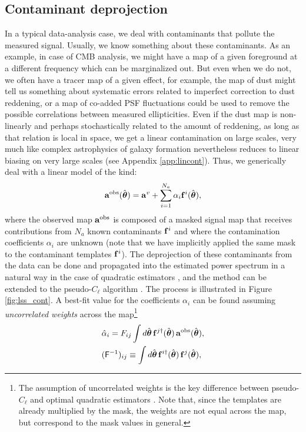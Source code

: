 \documentclass[usenatbib]{mnrasb}
\newcommand{\nv}{\hat{\boldsymbol{\theta}}}
\begin{document}
    \subsection{Contaminant deprojection}\label{ssec:maths.deproj}
      In a typical data-analysis case, we deal with contaminants that pollute the measured signal. Usually, we know something about these contaminants. As an example, in case of CMB analysis, we might have a map of a given foreground at a different frequency which can be marginalized out. But even when we do not, we often have a tracer map of a given effect, for example, the map of dust might tell us something about systematic errors related to imperfect correction to dust reddening, or a map of co-added PSF fluctuations could be used to remove the possible correlations between measured ellipticities. Even if the dust map is non-linearly and perhaps stochastically related to the amount of reddening, as long as that relation is local in space, we get a linear contamination on large scales, very much like complex astrophysics of galaxy formation nevertheless reduces to linear biasing on very large scales (see Appendix \ref{app:lincont}). Thus, we generically deal with a linear model of the kind:
      \begin{equation}\label{eq:aobs}
        {\bf a}^{\rm obs}(\nv)={\bf a}^v+\sum_{i=1}^{N_a}\alpha_i{\bf f}^i(\nv),
      \end{equation}
      where the observed map ${\bf a}^{\rm obs}$ is composed of a masked signal map that receives contributions from $N_a$ known contaminants ${\bf f}^i$ and where the contamination coefficients $\alpha_i$ are unknown (note that we have implicitly applied the same mask to the contaminant templates ${\bf f}^i$). The deprojection of these contaminants from the data can be done and propagated into the estimated power spectrum in a natural way in the case of quadratic estimators \citep{1992ApJ...398..169R,2004PhRvD..69l3003S,2016MNRAS.456.2095E}, and the method can be extended to the pseudo-$C_\ell$ algorithm \citep{2017MNRAS.465.1847E}. The process is illustrated in Figure \ref{fig:lss_cont}. A best-fit value for the coefficients $\alpha_i$ can be found assuming \emph{uncorrelated weights} across the map\footnote{The assumption of uncorrelated weights is the key difference between pseudo-$C_\ell$ and optimal quadratic estimators \citep{2013MNRAS.435.1857L}. Note that, since the templates are already multiplied by the mask, the weights are not equal across the map, but correspond to the mask values in general.}
      \begin{align}\label{eq:deproj_coeff}
        &\hat{\alpha}_i=F_{ij}\int d\nv\,{\bf f}^{j\dag}(\nv)\,{\bf a}^{\rm obs}(\nv),\\\nonumber
        &({\sf F}^{-1})_{ij}\equiv\int d\nv\, {\bf f}^{i\dag}(\nv)\,{\bf f}^j(\nv),
      \end{align}
\end{document}
